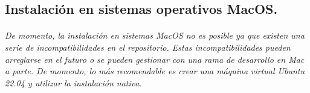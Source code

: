 \subsection{Instalación en sistemas operativos MacOS.}

\paragraph{}\emph{De momento, la instalación en sistemas MacOS no es posible ya que
existen una serie de incompatibilidades en el repositorio. Estas incompatibilidades
pueden arreglarse en el futuro o se pueden gestionar con una rama de desarrollo en Mac
a parte. De momento, lo más recomendable es crear una máquina virtual Ubuntu 22.04 y
utilizar la instalación nativa.}

